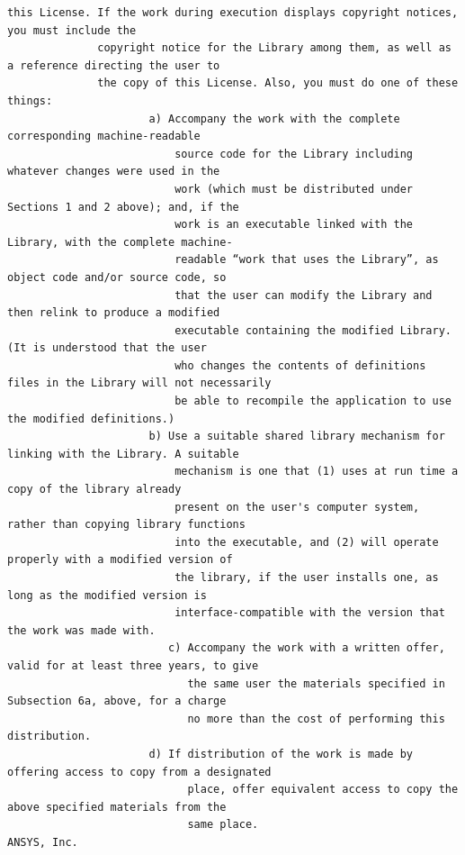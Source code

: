 \begin{lstlisting}[basicstyle=\ttfamily\scriptsize,breaklines=true]
              this License. If the work during execution displays copyright notices, you must include the
              copyright notice for the Library among them, as well as a reference directing the user to
              the copy of this License. Also, you must do one of these things:
                      a) Accompany the work with the complete corresponding machine-readable
                          source code for the Library including whatever changes were used in the
                          work (which must be distributed under Sections 1 and 2 above); and, if the
                          work is an executable linked with the Library, with the complete machine-
                          readable “work that uses the Library”, as object code and/or source code, so
                          that the user can modify the Library and then relink to produce a modified
                          executable containing the modified Library. (It is understood that the user
                          who changes the contents of definitions files in the Library will not necessarily
                          be able to recompile the application to use the modified definitions.)
                      b) Use a suitable shared library mechanism for linking with the Library. A suitable
                          mechanism is one that (1) uses at run time a copy of the library already
                          present on the user's computer system, rather than copying library functions
                          into the executable, and (2) will operate properly with a modified version of
                          the library, if the user installs one, as long as the modified version is
                          interface-compatible with the version that the work was made with.
                         c) Accompany the work with a written offer, valid for at least three years, to give
                            the same user the materials specified in Subsection 6a, above, for a charge
                            no more than the cost of performing this distribution.
                      d) If distribution of the work is made by offering access to copy from a designated
                            place, offer equivalent access to copy the above specified materials from the
                            same place.
ANSYS, Inc.


\end{lstlisting}
